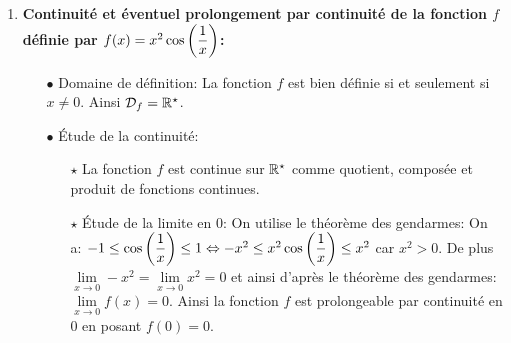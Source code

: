 \documentclass[a4paper, 11pt,reqno]{article}
\begin{document}
\begin{correction}
\begin{enumerate}
\begin{itemize}
\begin{itemize}
				            \item[$\star$] \'Etude de la limite en 0: on a: $f(x)=x\ln{|x^2-1|}-x\ln{|x|}$. Par croissance compar\'ee, on obtient donc que: $\lim\limits_{x\to 0^-} x\ln{|x|}=0$. Et ainsi par propri\'et\'e sur les sommes, compos\'ee et produit de limites, on obtient que $\lim\limits_{x\to 0^-} f(x)=0$.
				                  Ainsi la fonction $f$ est prolongeable par continuit\'e en 0 en posant $f(0)=0$.
				            \item[$\star$] \'Etude de la limite en 1:  par propri\'et\'e sur les somme, quotient, compos\'ee et produit de limites, on obtient que $\lim\limits_{x\to 1^+} f(x)=-\infty$. Ainsi la fonction $f$ n'est pas prolongeable par continuit\'e en 1 et la courbe $\mathcal{C}_{f}$ admet une asymptote verticale d'\'equation $x=1$.
			            \end{itemize}
		      \end{itemize}
		      On obtient alors une nouvelle fonction que l'on continue de noter $f$ qui est d\'efinie sur $\rbrack -1,0\rbrack\cup\rbrack 1,+\infty\lbrack$ par $f(x)=\left\lbrace \begin{array}{ll}  x\ln{\left(  \ddp\frac{x^2-1}{x} \right)}& \hbox{si}\ x\in \rbrack -1,0\lbrack\cup\rbrack 1,+\infty\lbrack,\vsec\\ 0& \hbox{si}\ x=0  \end{array}\right.$ Cette fonction est alors bien continue sur $\rbrack -1,0\rbrack\cup\rbrack 1,+\infty\lbrack$ car elle est continue sur $\rbrack -1,0\lbrack\cup\rbrack 1,+\infty\lbrack$ comme somme, quotient,compos\'ee et produit de fonctions continues et elle est continue en 0 par prolongement.
		\item \textbf{Continuit\'e et \'eventuel prolongement par continuit\'e de la fonction $f$ d\'efinie par $f(x)=x^2\cos{\left( \displaystyle\frac{1}{x} \right)}$:}
		      \begin{itemize}
			      \item[$\bullet$] Domaine de d\'efinition: La fonction $f$ est bien d\'efinie si et seulement si $x\not= 0$. Ainsi $\mathcal{D}_{f}=\mathbb{R}^{\star}$.
			      \item[$\bullet$] \'Etude de la continuit\'e:
			            \begin{itemize}
				            \item[$\star$] La fonction $f$ est continue sur $\mathbb{R}^{\star}$ comme quotient, compos\'ee et produit de fonctions continues.
				            \item[$\star$] \'Etude de la limite en 0: On utilise le th\'eor\`{e}me des gendarmes: On a: $-1\leq \cos{\left( \displaystyle\frac{1}{x} \right)} \leq 1\Leftrightarrow -x^2\leq x^2\cos{\left( \displaystyle\frac{1}{x} \right)} \leq x^2$ car $x^2>0$. De plus $\lim\limits_{x\to 0} -x^2=\lim\limits_{x\to 0} x^2=0$ et ainsi d'apr\`{e}s le th\'eor\`{e}me des gendarmes: $\lim\limits_{x\to 0}  f(x)=0$. Ainsi la fonction $f$ est prolongeable par continuit\'e en 0 en posant $f(0)=0$.

\end{itemize}
\end{itemize}
\end{enumerate}
\end{correction}
\end{document}
